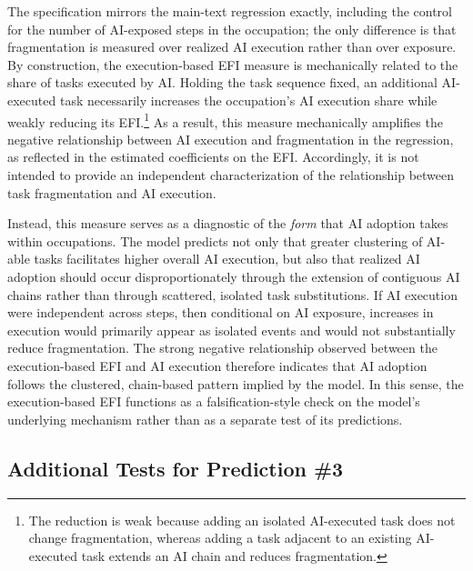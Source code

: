 The specification mirrors the main-text regression exactly, including the control for the number of AI-exposed steps in the occupation; the only difference is that fragmentation is measured over realized AI execution rather than over exposure.
By construction, the execution-based EFI measure is mechanically related to the share of tasks executed by AI.
Holding the task sequence fixed, an additional AI-executed task necessarily increases the occupation's AI execution share while weakly reducing its EFI.\footnote{The reduction is weak because adding an isolated AI-executed task does not change fragmentation, whereas adding a task adjacent to an existing AI-executed task extends an AI chain and reduces fragmentation.}
As a result, this measure mechanically amplifies the negative relationship between AI execution and fragmentation in the regression, as reflected in the estimated coefficients on the EFI.
Accordingly, it is not intended to provide an independent characterization of the relationship between task fragmentation and AI execution.

Instead, this measure serves as a diagnostic of the \emph{form} that AI adoption takes within occupations.
The model predicts not only that greater clustering of AI-able tasks facilitates higher overall AI execution, but also that realized AI adoption should occur disproportionately through the extension of contiguous AI chains rather than through scattered, isolated task substitutions.
If AI execution were independent across steps, then conditional on AI exposure, increases in execution would primarily appear as isolated events and would not substantially reduce fragmentation.
The strong negative relationship observed between the execution-based EFI and AI execution therefore indicates that AI adoption follows the clustered, chain-based pattern implied by the model.
In this sense, the execution-based EFI functions as a falsification-style check on the model's underlying mechanism rather than as a separate test of its predictions.


\subsection{Additional Tests for Prediction \#3}
\label{app:additional_robustness_pred3}

